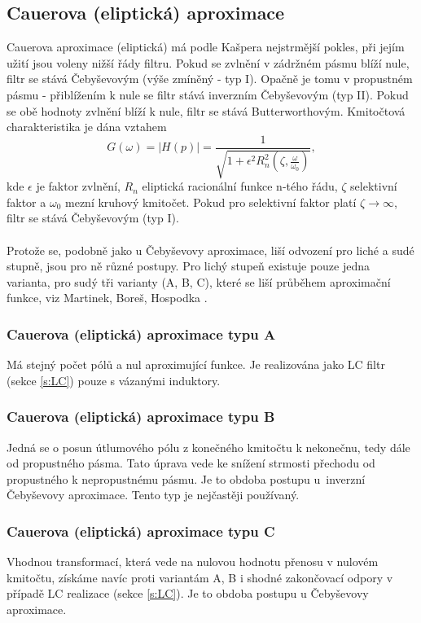\subsection{Cauerova (eliptická) aproximace}
\noindent Cauerova aproximace (eliptická) má podle Kašpera \cite{7} nejstrmější pokles, při jejím užití jsou voleny nižší řády filtru. Pokud se zvlnění v zádržném pásmu blíží nule, filtr se stává Čebyševovým (výše zmíněný - typ I). Opačně je tomu v propustném pásmu - přiblížením k nule se filtr stává inverzním Čebyševovým (typ II).  Pokud se obě hodnoty zvlnění blíží k nule, filtr se stává Butterworthovým. Kmitočtová charakteristika je dána vztahem
\begin{equation}
G(\omega) = |H(p)| = \frac{1}{\sqrt{1 + \epsilon ^2 R_n ^2(\zeta, \frac{\omega}{\omega _0})}},
\end{equation}
kde $\epsilon$ je faktor zvlnění, $R_n$ eliptická racionální funkce n-tého řádu, $\zeta$ selektivní faktor a $\omega _0$ mezní kruhový kmitočet. Pokud pro selektivní faktor platí $\zeta \rightarrow \infty$, filtr se stává Čebyševovým (typ I).\\
\\
Protože se, podobně jako u Čebyševovy aproximace, liší odvození pro liché a sudé stupně, jsou pro ně různé postupy. Pro lichý stupeň existuje pouze jedna varianta, pro sudý tři varianty (A, B, C), které se liší průběhem aproximační funkce, viz Martinek, Boreš, Hospodka \cite{12}.
\subsubsection{Cauerova (eliptická) aproximace typu A}
Má stejný počet pólů a nul aproximující funkce. Je realizována jako LC filtr (sekce \ref{s:LC}) pouze s vázanými induktory.
\subsubsection{Cauerova (eliptická) aproximace typu B}
Jedná se o posun útlumového pólu z konečného kmitočtu k nekonečnu, tedy dále od propustného pásma. Tato úprava vede ke snížení strmosti přechodu od propustného k nepropustnému pásmu. Je to obdoba postupu u~inverzní Čebyševovy aproximace. Tento typ je nejčastěji používaný.
\subsubsection{Cauerova (eliptická) aproximace typu C}
Vhodnou transformací, která vede na nulovou hodnotu přenosu v nulovém kmitočtu, získáme navíc proti variantám A, B i shodné zakončovací odpory v případě LC realizace (sekce \ref{s:LC}). Je to obdoba postupu u Čebyševovy aproximace.
